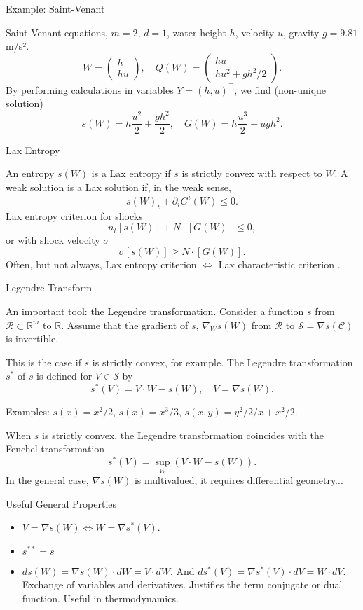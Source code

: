 \documentclass[english]{beamer}
\begin{document}
\begin{frame}{Example: Saint-Venant}

Saint-Venant equations, $m=2$, $d=1$, water height $h$, velocity $u$, gravity $g=9.81$m/s².
\[
W=\begin{pmatrix}
h\\
hu
\end{pmatrix},\quad Q(W)=\begin{pmatrix}
hu\\
hu^{2}+gh^{2}/2
\end{pmatrix}.
\]
By performing calculations in variables $Y=(h,u)^{\top}$, we find (non-unique solution)
\[
s(W)=h\frac{u^{2}}{2}+\frac{gh^{2}}{2},\quad G(W)=h\frac{u^{3}}{2}+ugh^{2}.
\]

\end{frame}
%
\begin{frame}{Lax Entropy}

An entropy $s(W)$ is a Lax entropy if $s$ is strictly convex with respect to $W$. A weak solution is a Lax solution if, in the weak sense,
\[
s(W)_{t}+\partial_{i}G^{i}(W)\leq0.
\]
Lax entropy criterion for shocks
\[
n_{t}[s(W)]+N\cdot[G(W)]\leq0,
\]
or with shock velocity $\sigma$
\[
\sigma[s(W)]\geq N\cdot[G(W)].
\]
Often, but not always, Lax entropy criterion $\Leftrightarrow$ Lax characteristic criterion \cite{lax72}.
\end{frame}
%
\begin{frame}{Legendre Transform}

An important tool: the Legendre transformation. Consider a function $s$ from $\mathcal{R}\subset\mathbb{R}^{m}$ to $\mathbb{R}$. Assume that the gradient of $s$, $\nabla_W s(W)$ from $\mathcal{R}$ to $\mathcal{S}=\nabla s(\mathcal{C})$ is invertible.

This is the case if $s$ is strictly convex, for example. The Legendre transformation $s^{*}$ of $s$ is defined for $V\in\mathcal{S}$ by
\[
s^{\ast}(V)=V\cdot W-s(W),\quad V=\nabla s(W).
\]

Examples: $s(x)=x^{2}/2$, $s(x)=x^{3}/3$, $s(x,y)=y^{2}/2/x+x^{2}/2$.

When $s$ is strictly convex, the Legendre transformation coincides with the Fenchel transformation
\[
s^{*}(V)=\sup_{W}\left(V\cdot W-s(W)\right).
\]
In the general case, $\nabla s(W)$ is multivalued, it requires differential geometry... 
\end{frame}
%
\begin{frame}{Useful General Properties}
\begin{itemize}
\item $V=\nabla s(W)\Leftrightarrow W=\nabla s^{*}(V)$.
\item $s^{**}=s$
\item $ds(W)=\nabla s(W)\cdot dW=V\cdot dW$. And $ds^{*}(V)=\nabla s^{*}(V)\cdot dV=W\cdot dV$. Exchange of variables and derivatives. Justifies the term conjugate or dual function. Useful in thermodynamics.
\end{itemize}
\end{frame}
%
\end{document}
